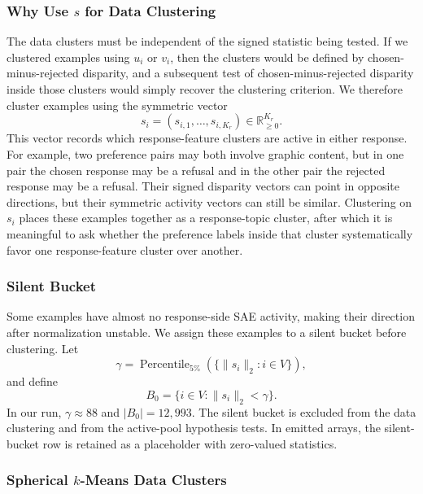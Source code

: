 \documentclass{article} %
\begin{document}
\subsubsection{Why Use $s$ for Data Clustering}
\label{app:ftd-why-s}

The data clusters must be independent of the signed statistic being tested. If we clustered examples using $u_i$ or $v_i$, then the clusters would be defined by chosen-minus-rejected disparity, and a subsequent test of chosen-minus-rejected disparity inside those clusters would simply recover the clustering criterion. We therefore cluster examples using the symmetric vector
\begin{equation}
s_i = (s_{i,1},\ldots,s_{i,K_r}) \in \mathbb{R}_{\geq 0}^{K_r}.
\end{equation}
This vector records which response-feature clusters are active in either response. For example, two preference pairs may both involve graphic content, but in one pair the chosen response may be a refusal and in the other pair the rejected response may be a refusal. Their signed disparity vectors can point in opposite directions, but their symmetric activity vectors can still be similar. Clustering on $s_i$ places these examples together as a response-topic cluster, after which it is meaningful to ask whether the preference labels inside that cluster systematically favor one response-feature cluster over another.

\subsubsection{Silent Bucket}
\label{app:ftd-silent-bucket}

Some examples have almost no response-side SAE activity, making their direction after normalization unstable. We assign these examples to a silent bucket before clustering. Let
\begin{equation}
\gamma = \operatorname{Percentile}_{5\%}\left(\{\|s_i\|_2 : i\in V\}\right),
\end{equation}
and define
\begin{equation}
B_0 = \{i\in V : \|s_i\|_2 < \gamma\}.
\end{equation}
In our run, $\gamma\approx 88$ and $|B_0|=12{,}993$. The silent bucket is excluded from the data clustering and from the active-pool hypothesis tests. In emitted arrays, the silent-bucket row is retained as a placeholder with zero-valued statistics.

\subsubsection{Spherical $k$-Means Data Clusters}
\label{app:ftd-spherical-kmeans}
\end{document}
